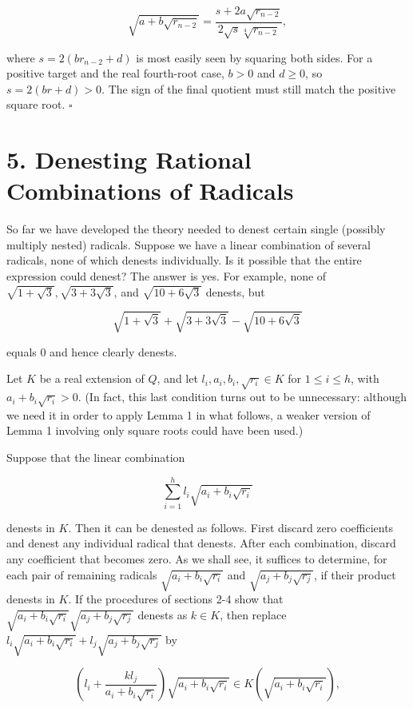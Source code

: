 \documentclass[11pt,letterpaper]{article}
\begin{document}
\[
\sqrt{a+b \sqrt{r_{n-2}}}=\frac{s+2 a \sqrt{r_{n-2}}}{2 \sqrt{s} \sqrt[4]{r_{n-2}}},
\]

where $s=2\left(b r_{n-2}+d\right)$ is most easily seen by squaring both sides. For a positive target and the real fourth-root case, $b>0$ and $d\geq0$, so $s=2(br+d)>0$. The sign of the final quotient must still match the positive square root. \(\square\)

\section*{5. Denesting Rational Combinations of Radicals}
So far we have developed the theory needed to denest certain single (possibly multiply nested) radicals. Suppose we have a linear combination of several radicals, none of which denests individually. Is it possible that the entire expression could denest? The answer is yes. For example, none of $\sqrt{1+\sqrt{3}}, \sqrt{3+3 \sqrt{3}}$, and $\sqrt{10+6 \sqrt{3}}$ denests, but

\[
\sqrt{1+\sqrt{3}}+\sqrt{3+3 \sqrt{3}}-\sqrt{10+6 \sqrt{3}}
\]

equals 0 and hence clearly denests.

Let $K$ be a real extension of $Q$, and let $l_{i}, a_{i}, b_{i}, \sqrt{r_{i}} \in K$ for $1 \leqslant i \leqslant h$, with $a_{i}+b_{i} \sqrt{r_{i}}>0$. (In fact, this last condition turns out to be unnecessary: although we need it in order to apply Lemma 1 in what follows, a weaker version of Lemma 1 involving only square roots could have been used.)

Suppose that the linear combination

\[
\sum_{i=1}^{h} l_{i} \sqrt{a_{i}+b_{i} \sqrt{r_{i}}}
\]

denests in $K$. Then it can be denested as follows. First discard zero coefficients and denest any individual radical that denests. After each combination, discard any coefficient that becomes zero. As we shall see, it suffices to determine, for each pair of remaining radicals $\sqrt{a_{i}+b_{i} \sqrt{r_{i}}}$ and $\sqrt{a_{j}+b_{j} \sqrt{r_{j}}}$, if their product denests in $K$. If the procedures of sections 2-4 show that $\sqrt{a_{i}+b_{i} \sqrt{r_{i}}} \sqrt{a_{j}+b_{j} \sqrt{r_{j}}}$ denests as $k \in K$, then replace $l_{i} \sqrt{a_{i}+b_{i} \sqrt{r_{i}}}+l_{j} \sqrt{a_{j}+b_{j} \sqrt{r_{j}}}$ by

\[
\left(l_{i}+\frac{k l_{j}}{a_{i}+b_{i} \sqrt{r_{i}}}\right) \sqrt{a_{i}+b_{i} \sqrt{r_{i}}} \in K\left(\sqrt{a_{i}+b_{i} \sqrt{r_{i}}}\right),
\]
\end{document}
